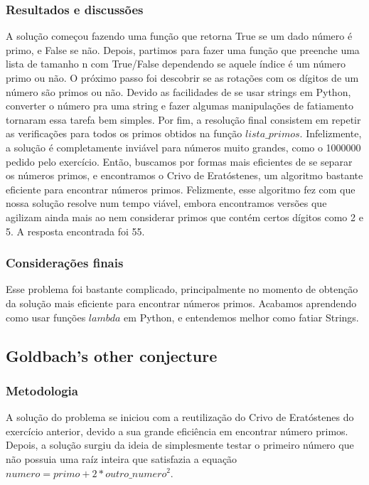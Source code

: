 \documentclass{article}
\begin{document}
        \subsubsection{Resultados e discussões}
        A solução começou fazendo uma função que retorna True se um dado número é primo, e False se não. Depois, partimos para fazer uma função que preenche uma lista de tamanho n com True/False dependendo se aquele índice é um número primo ou não.
        O próximo passo foi descobrir se as rotações com os dígitos de um número são primos ou não. Devido as facilidades de se usar strings em Python, converter o número pra uma string e fazer algumas manipulações de fatiamento tornaram essa tarefa bem simples.
        Por fim, a resolução final consistem em repetir as verificações para todos os primos obtidos na função $lista\_primos$. Infelizmente, a solução é completamente inviável para números muito grandes, como o 1000000 pedido pelo exercício. Então, buscamos por formas mais eficientes de se separar os números primos, e encontramos o Crivo de Eratóstenes, um algoritmo bastante eficiente para encontrar números primos. Felizmente, esse algoritmo fez com que nossa solução resolve num tempo viável, embora encontramos versões que agilizam ainda mais ao nem considerar primos que contém certos dígitos como 2 e 5.
        A resposta encontrada foi 55.
        
        \subsubsection{Considerações finais}
        Esse problema foi bastante complicado, principalmente no momento de obtenção da solução mais eficiente para encontrar números primos. Acabamos aprendendo como usar funções $lambda$ em Python, e entendemos melhor como fatiar Strings.
        
    \subsection{Goldbach's other conjecture}
        
        \subsubsection{Metodologia}
        A solução do problema se iniciou com a reutilização do Crivo de Eratóstenes do exercício anterior, devido a sua grande eficiência em encontrar número primos. Depois, a solução surgiu da ideia de simplesmente testar o primeiro número que não possuia uma raíz inteira que satisfazia a equação $numero = primo + 2 * outro\_numero^2$.
       
\end{document}
